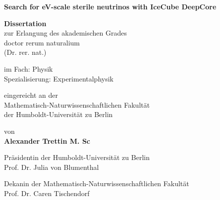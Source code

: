 \documentclass[
a4paper, %
fontsize=10pt, %
twoside=true, %
numbers=noenddot, %
fontmethod=tex, %
]{kaobook}
\begin{document}
\frontmatter %

\begin{titlepage}
	\begin{center}
	\vspace*{1cm}

	\LARGE
	\textbf{Search for eV-scale sterile neutrinos with IceCube DeepCore}
	\large

	\vspace{0.8cm}

	\textbf{Dissertation}\\
	zur Erlangung des akademischen Grades\\
	doctor rerum naturalium \\
	(Dr. rer. nat.) \\

	\vspace{0.5cm}

	im Fach: Physik \\
	Spezialisierung: Experimentalphysik\\

	\vspace{0.5cm}

	eingereicht an der \\
	Mathematisch-Naturwissenschaftlichen Fakultät\\
	der Humboldt-Universität zu Berlin\\

	\vspace{0.5cm}

	von\\
	\textbf{Alexander Trettin M. Sc}\\

	\vspace{0.5cm}

	Präsidentin der Humboldt-Universität zu Berlin\\
	Prof. Dr. Julia von Blumenthal\\

	\vspace{0.5cm}

	Dekanin der Mathematisch-Naturwissenschaftlichen Fakultät\\
	Prof. Dr. Caren Tischendorf\\


\end{center}
\end{titlepage}
\end{document}
